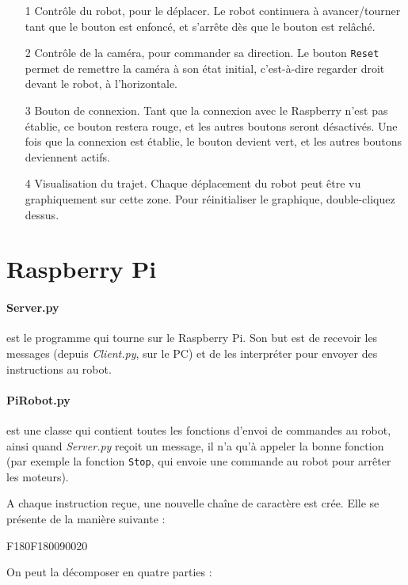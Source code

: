 \documentclass[12pt,a4paper]{report}
\begin{document}
\begin{itemize}
\item[1] Contrôle du robot, pour le déplacer. Le robot continuera à avancer/tourner tant que le bouton est enfoncé, et s'arrête dès que le bouton est relâché.
\item[2] Contrôle de la caméra, pour commander sa direction. Le bouton \verb=Reset= permet de remettre la caméra à son état initial, c'est-à-dire regarder droit devant le robot, à l'horizontale.
\item[3] Bouton de connexion. Tant que la connexion avec le Raspberry n'est pas établie, ce bouton restera rouge, et les autres boutons seront désactivés. Une fois que la connexion est établie, le bouton devient vert, et les autres boutons deviennent actifs.
\item[4] Visualisation du trajet. Chaque déplacement du robot peut être vu graphiquement sur cette zone. Pour réinitialiser le graphique, double-cliquez dessus.
\end{itemize}

\section{Raspberry Pi}

\paragraph{Server.py} est le programme qui tourne sur le Raspberry Pi. Son but est de recevoir les messages (depuis \textit{Client.py}, sur le PC) et de les interpréter pour envoyer des instructions au robot.

\paragraph{PiRobot.py} est une classe qui contient toutes les fonctions d'envoi de commandes au robot, ainsi quand \textit{Server.py} reçoit un message, il n'a qu'à appeler la bonne fonction (par exemple la fonction \verb=Stop=, qui envoie une commande au robot pour arrêter les moteurs).

A chaque instruction reçue, une nouvelle chaîne de caractère est crée. Elle se présente de la manière suivante :

\begin{verbatimtab}[3]
F180F180090020
\end{verbatimtab}

On peut la décomposer en quatre parties :
\end{document}
